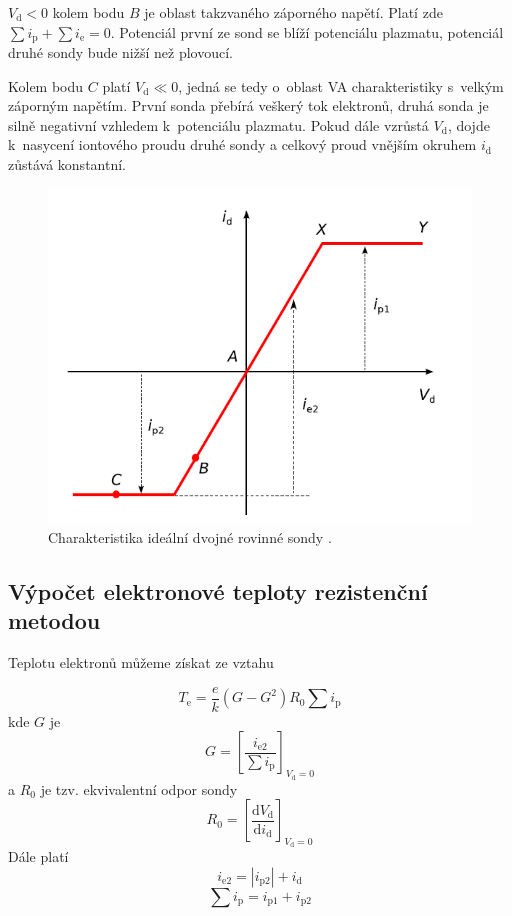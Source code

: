 \documentclass[a4paper,12pt]{article}
\begin{document}
$V_\text{{d}} < 0 $ kolem bodu $B$ je
oblast takzvaného záporného napětí. Platí zde 	
$\sum i_\text{{p}} + \sum i_\text{{e}} = 0$.
Potenciál první ze sond se blíží potenciálu plazmatu,
potenciál druhé sondy bude nižší než plovoucí.

Kolem bodu $C$ platí $V_\text{{d}} \ll 0 $, jedná se tedy
o~oblast VA charakteristiky s~velkým záporným napětím.
První sonda přebírá veškerý tok elektronů, druhá sonda
je silně negativní vzhledem k~potenciálu plazmatu.
Pokud dále vzrůstá $V_\text{{d}}$, dojde k~nasycení
iontového proudu druhé sondy a celkový proud vnějším
okruhem $i_\text{{d}}$ zůstává konstantní.

\begin{figure}[h]
	\centering
	\includegraphics[width=130mm]{charakteristikadvojna.png}
	\caption{Charakteristika ideální dvojné rovinné sondy \cite{navod}.}
	\label{charakteristikadvojna}
\end{figure}
\newpage

\subsection{Výpočet elektronové teploty rezistenční metodou}
Teplotu elektronů můžeme získat ze vztahu

\begin{equation}
	T_\text{{e}} = \frac{e}{k} (G-G^2) R_0 \sum i_\text{{p}}
	\label{T}
\end{equation}
kde $G$ je 
\begin{equation}
	G = \left[ \frac{i_\text{{e2}}}{\sum 
	i_\text{{p}}}\right]_{V_\text{d}=0}
	\label{G}
\end{equation}
a $R_0$ je tzv. ekvivalentní odpor sondy
\begin{equation}
	R_0 = \left[ \frac{\text{d} V_\text{d}} 
	{\text{d}i_\text{d}}\right]_{V_\text{d}=0}	 
	\label{R}
\end{equation}
Dále platí
\begin{equation}
	i_\text{{e2}} = |i_\text{{p2}}| + i_\text{{d}}
	\label{ie2}
\end{equation}
\begin{equation}
	\sum i_\text{{p}} = i_\text{{p1}} + i_\text{{p2}}
	\label{sumaip}
\end{equation}
\end{document}
